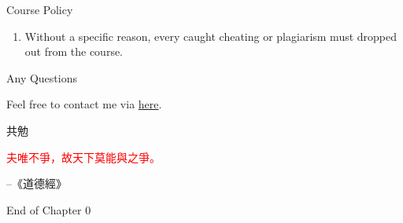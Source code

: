 \documentclass{beamer}
\begin{document}
\begin{frame}{Course Policy}
\begin{enumerate}
\pause
\item Without a specific reason, every caught cheating or plagiarism must dropped out from the course. \\
\end{enumerate}
\end{frame}
\begin{frame}{Any Questions}
\begin{center}
Feel free to contact me via \href{mailto:politics.tchsiao@gmail.com}{here}.
\end{center}
\end{frame}
\begin{frame}{共勉}
\begin{center}
\normalsize{\textcolor{red}{夫唯不爭，故天下莫能與之爭。}}
\end{center}
\vspace{3em}
\begin{flushright}
--《道德經》
\end{flushright}
\end{frame}
\begin{frame}{}
\begin{center}
\Large{End of Chapter 0}
\end{center}
\end{frame}
\end{document}

